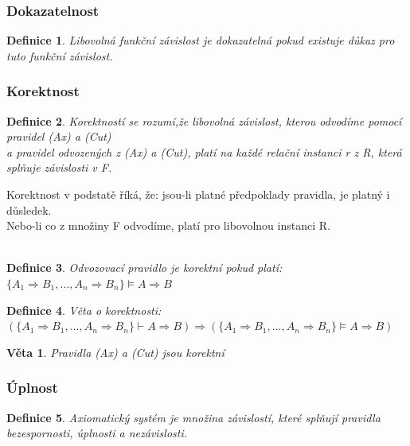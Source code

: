 \documentclass[10pt,a4paper]{article}
\newtheorem{veta}{Věta}
\newtheorem{definition}{Definice}
\begin{document}
\subsubsection{Dokazatelnost}

\begin{definition}
Libovolná funkční závislost je dokazatelná pokud existuje důkaz pro tuto funkční závislost.
\end{definition}

\subsubsection{Korektnost}

\begin{definition}
Korektností se rozumí,že libovolná závislost, kterou odvodíme pomocí pravidel (Ax) a (Cut)\\ 
a pravidel odvozených z (Ax) a (Cut), platí na každé relační instanci r z R, která splňuje závislosti v F. 
\end{definition}

Korektnost v podstatě říká, že: jsou-li platné předpoklady pravidla, je platný i důsledek.\\
Nebo-li co z množiny F odvodíme, platí pro libovolnou instanci R.\\
\\

\begin{definition}
Odvozovací pravidlo je korektní pokud platí: $\{A_1 \Rightarrow B_1 , ... , A_n \Rightarrow B_n\} \models A \Rightarrow B$
\end{definition}

\begin{definition}
Věta o korektnosti:\\ $(\{A_1 \Rightarrow B_1 , ... , A_n \Rightarrow B_n\} \vdash A \Rightarrow B) \Rightarrow (\{A_1 \Rightarrow B_1 , ... , A_n \Rightarrow B_n\} \models A \Rightarrow B)$
\end{definition}

\begin{veta}
Pravidla (Ax) a (Cut) jsou korektní
\end{veta}
\subsubsection{Úplnost}

\begin{definition}
Axiomatický systém je množina závislostí, které splňují pravidla bezespornosti, úplnosti a nezávislosti.
\end{definition}
\end{document}
